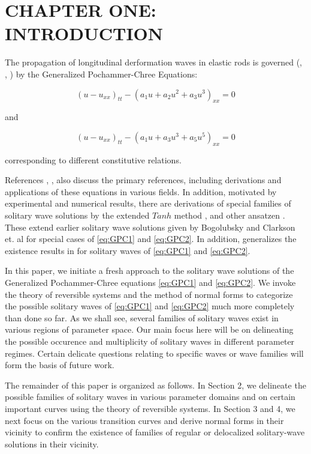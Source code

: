 \chapter{CHAPTER ONE: INTRODUCTION} \label{chapter_1}

The propagation of longitudinal derformation waves in elastic rods is governed
(\cite{LCZ}, \cite{Runz}, \cite{WM}) by the Generalized Pochammer-Chree
Equations:

\begin{equation}\label{eq:GPC1}
\left( u - u_{xx} \right)_{tt} - \left( a_1 u + a_2 u^2 + a_3 u^3 \right)_{xx} =0  
\end{equation}

and

\begin{equation}  \label{eq:GPC2} 
\left( u - u_{xx} \right)_{tt} - \left( a_1 u + a_3 u^3 + a_5 u^5 \right)_{xx} =0
\end{equation}

corresponding to different constitutive relations.

References \cite{LCZ}, \cite{Runz}, \cite{WM} also discuss the primary
references, including derivations and applications of these equations in
various fields. In addition, motivated by experimental and numerical results,
there are derivations of special families of solitary wave solutions by the
extended $Tanh$ method \cite{LCZ}, and other ansatzen \cite{WM}. These extend
earlier solitary wave solutions given by Bogolubsky \cite{Bogo} and Clarkson
et. al \cite{CLVS} for special cases of \eqref{eq:GPC1} and \eqref{eq:GPC2}. In
addition, \cite{Runz} generalizes the existence results in \cite{Sax} for
solitary waves of \eqref{eq:GPC1} and \eqref{eq:GPC2}.  

In this paper, we initiate a fresh approach to the solitary wave solutions of
the Generalized Pochammer-Chree equations \eqref{eq:GPC1} and \eqref{eq:GPC2}.
We invoke the theory of reversible systems and the method of normal forms to
categorize the possible solitary waves of \eqref{eq:GPC1} and \eqref{eq:GPC2}
much more completely than done so far.  As we shall see, several families of
solitary waves exist in various regions of parameter space. Our main focus here
will be on delineating the possible occurence and multiplicity of solitary
waves in different parameter regimes. Certain delicate questions relating to
specific waves or wave families will form the basis of future work. 

The remainder of this paper is organized as follows. In Section 2, we delineate
the possible families of solitary waves in various parameter domains and on
certain important curves using the theory of reversible systems. In Section 3
and 4, we next focus on the various transition curves and derive normal forms
in their vicinity to confirm the existence of families of regular or
delocalized solitary-wave solutions in their vicinity.
